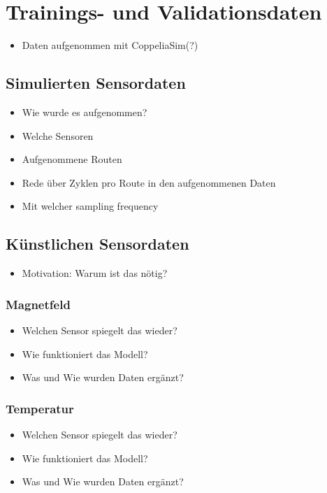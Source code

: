 \chapter{Trainings- und Validationsdaten}
\begin{itemize}
    \item Daten aufgenommen mit CoppeliaSim(?)
\end{itemize}

\section{Simulierten Sensordaten}
\begin{itemize}
    \item Wie wurde es aufgenommen?
    \item Welche Sensoren
    \item Aufgenommene Routen
    \item Rede über Zyklen pro Route in den aufgenommenen Daten
    \item Mit welcher sampling frequency
\end{itemize}

\section{Künstlichen Sensordaten}
\begin{itemize}
    \item Motivation: Warum ist das nötig?
\end{itemize}

\subsection{Magnetfeld}
\begin{itemize}
    \item Welchen Sensor spiegelt das wieder?
    \item Wie funktioniert das Modell?
    \item Was und Wie wurden Daten ergänzt?
\end{itemize}

\subsection{Temperatur}
\begin{itemize}
    \item Welchen Sensor spiegelt das wieder?
    \item Wie funktioniert das Modell?
    \item Was und Wie wurden Daten ergänzt?
\end{itemize}

